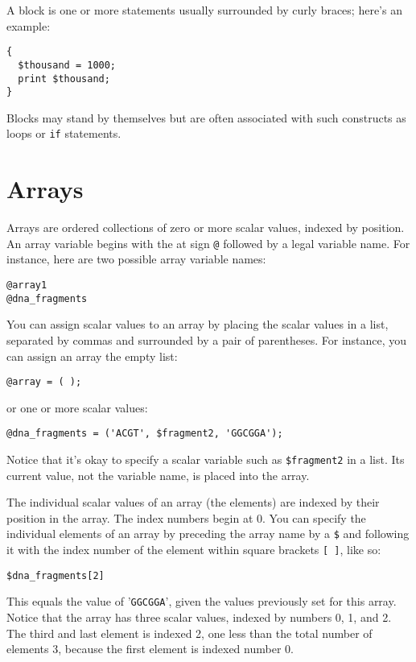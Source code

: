 A block is one or more statements usually surrounded by curly braces; here's an example:

\begin{lstlisting}
{
  $thousand = 1000;
  print $thousand;
}
\end{lstlisting}

Blocks may stand by themselves but are often associated with such constructs as loops or \verb|if| statements.

\section{Arrays}
Arrays are ordered collections of zero or more scalar values, indexed by position. An array variable begins with the at sign \verb|@| followed by a legal variable name. For instance, here are two possible array variable names:

\begin{lstlisting}
@array1
@dna_fragments
\end{lstlisting}

You can assign scalar values to an array by placing the scalar values in a list, separated by commas and surrounded by a pair of parentheses. For instance, you can assign an array the empty list:

\begin{lstlisting}
@array = ( );
\end{lstlisting}

or one or more scalar values:

\begin{lstlisting}
@dna_fragments = ('ACGT', $fragment2, 'GGCGGA');
\end{lstlisting}

Notice that it's okay to specify a scalar variable such as \verb|$fragment2| in a list. Its current value, not the variable name, is placed into the array.

The individual scalar values of an array (the elements) are indexed by their position in the array. The index numbers begin at 0. You can specify the individual elements of an array by preceding the array name by a \verb|$| and following it with the index number of the element within square brackets \verb|[ ]|, like so:

\begin{lstlisting}
$dna_fragments[2]
\end{lstlisting}

This equals the value of '\verb|GGCGGA|', given the values previously set for this array. Notice that the array has three scalar values, indexed by numbers 0, 1, and 2. The third and last element is indexed 2, one less than the total number of elements 3, because the first element is indexed number 0.


